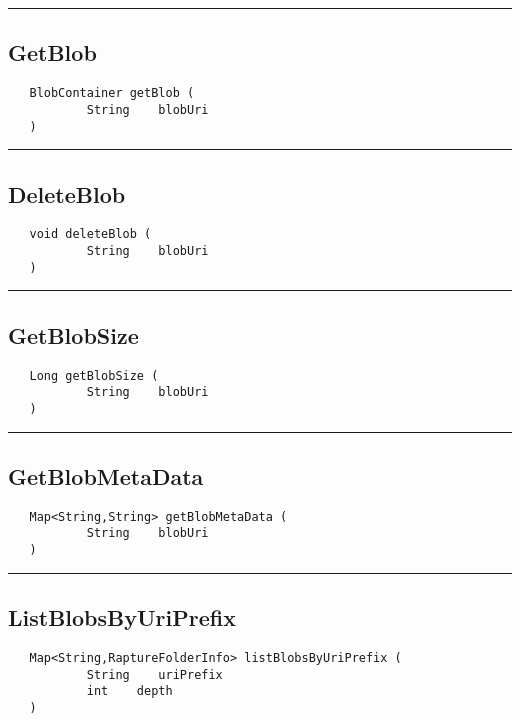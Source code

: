 \rule{15cm}{2pt}
\subsection{GetBlob}
\label{Api:GetBlob}
\begin{verbatim}
   BlobContainer getBlob (
           String    blobUri
   )
\end{verbatim}



\rule{15cm}{2pt}
\subsection{DeleteBlob}
\label{Api:DeleteBlob}
\begin{verbatim}
   void deleteBlob (
           String    blobUri
   )
\end{verbatim}



\rule{15cm}{2pt}
\subsection{GetBlobSize}
\label{Api:GetBlobSize}
\begin{verbatim}
   Long getBlobSize (
           String    blobUri
   )
\end{verbatim}



\rule{15cm}{2pt}
\subsection{GetBlobMetaData}
\label{Api:GetBlobMetaData}
\begin{verbatim}
   Map<String,String> getBlobMetaData (
           String    blobUri
   )
\end{verbatim}



\rule{15cm}{2pt}
\subsection{ListBlobsByUriPrefix}
\label{Api:ListBlobsByUriPrefix}
\begin{verbatim}
   Map<String,RaptureFolderInfo> listBlobsByUriPrefix (
           String    uriPrefix
           int    depth
   )
\end{verbatim}



